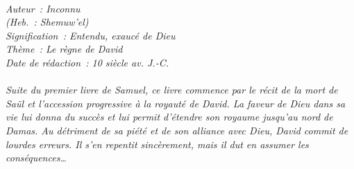 \BFont
\noindent\hrulefill
{\footnotesize
\textit{
\bigskip
{\centering{}
\\Auteur~: Inconnu
\\(Heb.~: Shemuw'el)
\\Signification~: Entendu, exaucé de Dieu
\\Thème~: Le règne de David
\\Date de rédaction~: 10 siècle av. J.-C.\\}
}
\textit{
\\Suite du premier livre de Samuel, ce livre commence par le récit de la mort de Saül et l'accession progressive à la royauté de David. La faveur de Dieu dans sa vie lui donna du succès et lui permit d'étendre son royaume jusqu'au nord de Damas. Au détriment de sa piété et de son alliance avec Dieu, David commit de lourdes erreurs. Il s'en repentit sincèrement, mais il dut en assumer les conséquences…\bigskip
}
}
\par\nobreak\noindent\hrulefill
